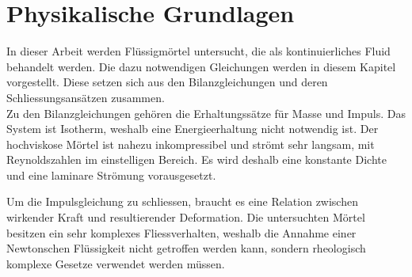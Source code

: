 \section{Physikalische Grundlagen}
\label{Kapitel:Rheologie}
In dieser Arbeit werden Flüssigmörtel untersucht, die als kontinuierliches Fluid behandelt werden.
Die dazu notwendigen Gleichungen werden in diesem Kapitel vorgestellt. Diese setzen sich aus den Bilanzgleichungen und deren Schliessungsansätzen zusammen.\\
Zu den Bilanzgleichungen gehören die Erhaltungssätze für Masse und Impuls. Das System ist Isotherm, weshalb eine Energieerhaltung nicht notwendig ist.
Der hochviskose Mörtel ist nahezu inkompressibel und strömt sehr langsam, mit Reynoldszahlen im einstelligen Bereich. Es wird deshalb eine konstante Dichte und eine laminare Strömung vorausgesetzt.

Um die Impulsgleichung zu schliessen, braucht es eine Relation zwischen wirkender Kraft und resultierender Deformation. Die untersuchten Mörtel besitzen ein sehr komplexes Fliessverhalten, weshalb die Annahme einer Newtonschen Flüssigkeit nicht getroffen werden kann, sondern rheologisch komplexe Gesetze verwendet werden müssen.



